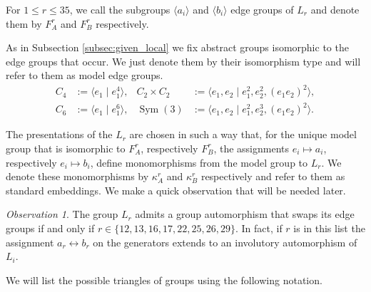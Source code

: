 \documentclass[dvipsnames]{article}
\theoremstyle{definition}
\theoremstyle{remark}
\newtheorem{observation}[theorem]{Observation}
\DeclareMathOperator{\Sym}{Sym}
\begin{document}
    For $1\leq r \leq 35$, we call the subgroups $\langle a_i \rangle$ and $\langle b_i \rangle$ edge groups of $L_r$ and denote them by $F^r_A$ and $F^r_B$ respectively.
    
    As in Subsection \ref{subsec:given_local} we fix abstract groups isomorphic to the edge groups that occur. We just denote them by their isomorphism type and will refer to them as model edge groups. 
    \begin{align*}
        C_4 & := \langle e_1 \mid e_1^4 \rangle,
        &
        C_2\times C_2 & := \langle e_1, e_2 \mid e_1^2, e_2^2, (e_1e_2)^2 \rangle,
        \\
        C_6 & := \langle e_1 \mid e_1^6 \rangle,
        &
        \Sym(3) & := \langle e_1, e_2 \mid e_1^2, e_2^3, (e_1e_2)^2 \rangle.
    \end{align*}

    The presentations of the $L_r$ are chosen in such a way that, for the unique model group that is isomorphic to $F_A^r$, respectively $F_B^r$, the assignments $e_i \mapsto a_i$, respectively $e_i \mapsto b_i$, define monomorphisms from the model group to $L_r$. We denote these monomorphisms by $\kappa_A^r$ and $\kappa_B^r$ respectively and refer to them as standard embeddings.
    We make a quick observation that will be needed later.

    \begin{observation}\label{obs:swap_edge_grps}
        The group $L_r$ admits a group automorphism that swaps its edge groups if and only if $r \in \{12,13,16,17,22,25,26,29\}$. In fact, if $r$ is in this list the assignment $a_r \leftrightarrow b_r$ on the generators extends to an involutory automorphism of $L_i$.
    \end{observation}

    We will list the possible triangles of groups using the following notation.
\end{document}
